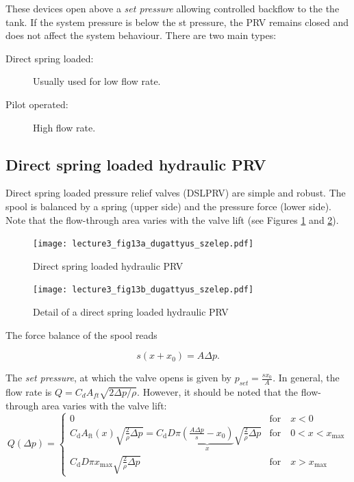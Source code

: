 These devices open above a \emph{set pressure} allowing controlled backflow to the the tank. If the system pressure is below the st pressure, the PRV remains closed and does not affect the system behaviour. There are two main types:
%
\begin{description}
\item[Direct spring loaded:] Usually used for low flow rate.
\item[Pilot operated:] High flow rate.
\end{description}

\subsection{Direct spring loaded hydraulic PRV}

Direct spring loaded pressure relief valves (DSLPRV) are simple and robust. The spool is balanced by a spring (upper side) and the pressure force (lower side). Note that the flow-through area varies with the valve lift (see Figures \ref{fig:direct_spring_loaded_PRV} and \ref{fig:detail_of_direct_spring_loaded_PRV}).

\begin{figure}[tbh]
\begin{center}
\texttt{[image: lecture3\_fig13a\_dugattyus\_szelep.pdf]}
\caption{\label{fig:direct_spring_loaded_PRV}Direct spring loaded hydraulic PRV}
\end{center}

\end{figure}
\begin{figure}[tbh]
\begin{center}
\texttt{[image: lecture3\_fig13b\_dugattyus\_szelep.pdf]}
\caption{\label{fig:detail_of_direct_spring_loaded_PRV}Detail of a direct spring loaded hydraulic PRV}
\end{center}
\end{figure}

The force balance of the spool reads

\begin{equation}
s\left(x+x_{\mathrm{0}}\right)=A\Delta p.
\end{equation}

\noindent The \emph{set pressure}, at which the valve opens is given by $p_{set}=\frac{s x_0}{A}$. In general, the flow rate is $Q=C_d A_{ft}\sqrt{2 \Delta p/\rho}$. However, it should be noted that the flow-through area varies with the valve lift:
\begin{equation}
Q(\Delta p)=
\begin{cases}
0 & \mathrm{for} \quad x<0\\
C_{\mathrm{d}}A_{\mathrm{ft}}(x)\sqrt{\frac{2}{\rho}\Delta p}=C_{\mathrm{d}}D\pi \underbrace{\left( \frac{A\Delta p}{s}-x_0 \right)}_{x}\sqrt{\frac{2}{\rho}\Delta p} & \mathrm{for} \quad 0<x<x_{\mathrm{max}} \\
C_{\mathrm{d}}D\pi x_{\mathrm{max}}\sqrt{\frac{2}{\rho}\Delta p} & \mathrm{for} \quad x>x_{\mathrm{max}}
\end{cases}
\end{equation}

